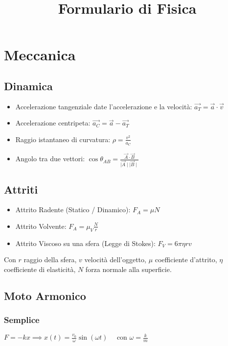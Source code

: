 \documentclass[a4paper,11pt]{article}
\title{Formulario di Fisica}
\author{}
\newcommand{\norm}[1]{\mid #1 \mid}
\begin{document}
\maketitle

\section*{Meccanica}
\subsection*{Dinamica}
\begin{itemize}
\item Accelerazione tangenziale date l'accelerazione e la velocit\`a: $\vec{a_T} = \vec{a} \cdot \vec{v}$
\item Accelerazione centripeta: $\vec{a_C} = \vec{a} - \vec{a_T}$
\item Raggio istantaneo di curvatura: $\rho = \frac{v^2}{a_C}$
\item Angolo tra due vettori: $\cos \theta_{AB} = \frac{\vec{A} \cdot \vec{B}}{\norm{\vec{A}}\norm{\vec{B}}}$
\end{itemize}

\subsection*{Attriti}
\begin{itemize}
\item Attrito Radente (Statico / Dinamico): $F_A = \mu N$
\item Attrito Volvente: $F_A = \mu_V \frac{N}{r}$
\item Attrito Viscoso su una sfera (Legge di Stokes): $F_V = 6\pi \eta r v$
\end{itemize}
Con $r$ raggio della sfera, $v$ velocit\`a dell'oggetto, $\mu$ coefficiente d'attrito, $\eta$ coefficiente di elasticit\`a, $N$ forza normale alla superficie.

\subsection*{Moto Armonico}
\subsubsection*{Semplice}
$F = -kx \implies x(t) = \frac{v_0}{\omega}\sin(\omega t) \quad \mbox{ con } \omega = \frac{k}{m}$
\end{document}
